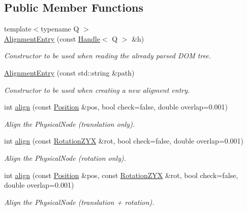 \subsection*{Public Member Functions}
\begin{DoxyCompactItemize}
\item 
{\footnotesize template$<$typename Q $>$ }\\\hyperlink{class_d_d4hep_1_1_geometry_1_1_alignment_entry_adff0670c0104476e4a7fcb1d1d0ec36d}{AlignmentEntry} (const \hyperlink{class_d_d4hep_1_1_handle}{Handle}$<$ Q $>$ \&h)
\begin{DoxyCompactList}\small\item\em Constructor to be used when reading the already parsed DOM tree. \item\end{DoxyCompactList}\item 
\hyperlink{class_d_d4hep_1_1_geometry_1_1_alignment_entry_a877bdea72e8ea9944d688a3d8f0c2c63}{AlignmentEntry} (const std::string \&path)
\begin{DoxyCompactList}\small\item\em Constructor to be used when creating a new aligment entry. \item\end{DoxyCompactList}\item 
int \hyperlink{class_d_d4hep_1_1_geometry_1_1_alignment_entry_aea159236f1998b0b4ed084d9b33d9179}{align} (const \hyperlink{namespace_d_d4hep_1_1_geometry_a55083902099d03506c6db01b80404900}{Position} \&pos, bool check=false, double overlap=0.001)
\begin{DoxyCompactList}\small\item\em Align the PhysicalNode (translation only). \item\end{DoxyCompactList}\item 
int \hyperlink{class_d_d4hep_1_1_geometry_1_1_alignment_entry_af2e1c4e25b729271106064e912de2645}{align} (const \hyperlink{namespace_d_d4hep_1_1_geometry_a24667b2b9c3cec3d5239828db4d52189}{RotationZYX} \&rot, bool check=false, double overlap=0.001)
\begin{DoxyCompactList}\small\item\em Align the PhysicalNode (rotation only). \item\end{DoxyCompactList}\item 
int \hyperlink{class_d_d4hep_1_1_geometry_1_1_alignment_entry_ad66e1d47dd542160eea927f23b76018a}{align} (const \hyperlink{namespace_d_d4hep_1_1_geometry_a55083902099d03506c6db01b80404900}{Position} \&pos, const \hyperlink{namespace_d_d4hep_1_1_geometry_a24667b2b9c3cec3d5239828db4d52189}{RotationZYX} \&rot, bool check=false, double overlap=0.001)
\begin{DoxyCompactList}\small\item\em Align the PhysicalNode (translation + rotation). \item\end{DoxyCompactList}\end{DoxyCompactItemize}


